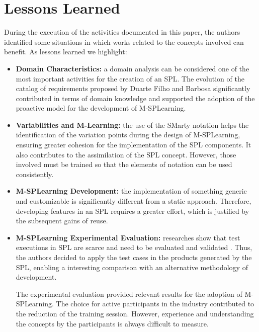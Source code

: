 \section{Lessons Learned}\label{section5}

During the execution of the activities documented in this paper, the authors identified some situations in which works related to the concepts involved can benefit. As lessons learned we highlight:

\begin{itemize}
    \item \textbf{Domain Characteristics:} a domain analysis can be considered one of the most important activities for the creation of an SPL. The evolution of the catalog of requirements proposed by Duarte Filho and Barbosa \cite{filho13} significantly contributed in terms of domain knowledge and supported the adoption of the proactive model for the development of M-SPLear\allowbreak ning.
    \item \textbf{Variabilities and M-Learning:} the use of the SMarty notation helps the identification of the variation points during the design of M-SPLear\allowbreak ning, ensuring greater cohesion for the implementation of the SPL components. It also contributes to the assimilation of the SPL concept. However, those involved must be trained so that the elements of notation can be used consistently.
    \item \textbf{M-SPLear\allowbreak ning Development:} the implementation of something generic and customizable is significantly different from a static approach. Therefore, developing features in an SPL requires a greater effort, which is justified by the subsequent gains of reuse.
    \item \textbf{M-SPLear\allowbreak ning Experimental Evaluation:} researches show that test executions in SPL are scarce and need to be evaluated and validated \cite{engstrom11}. Thus, the authors decided to apply the test cases in the products generated by the SPL, enabling a interesting comparison with an alternative methodology of development.
  
    The experimental evaluation provided relevant results for the adoption of M-SPLear\allowbreak ning. The choice for active participants in the industry contributed to the reduction of the training session. However, experience and understanding the concepts by the participants is always difficult to measure.
\end{itemize}